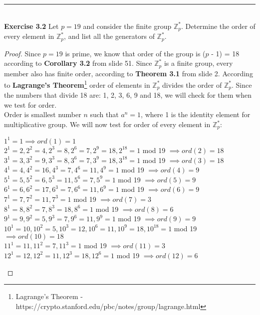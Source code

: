 \documentclass{article}
\begin{document}
\noindent\rule{12cm}{0.4pt}\\
\noindent \textbf{Exercise 3.2} Let $p = 19$ and consider the finite group $\mathbb{Z}^{*}_{p}$. Determine the order of every element in $\mathbb{Z}^{*}_{p}$, and list all the generators of $\mathbb{Z}^{*}_{p}$.
\begin{proof}
Since $p=19$ is prime, we know that order of the group is ($p$ - 1) = 18 according to \textbf{Corollary 3.2} from slide 51. Since $\mathbb{Z}^{*}_{p}$ is a finite group, every member also has finite order, according to \textbf{Theorem 3.1} from slide 2. According to \textbf{Lagrange's Theorem}\footnote{Lagrange's Theorem - https://crypto.stanford.edu/pbc/notes/group/lagrange.html} order of elements in $\mathbb{Z}^{*}_{p}$ divides the order of $\mathbb{Z}^{*}_{p}$. Since the numbers that divide 18 are: 1, 2, 3, 6, 9 and 18, we will check for them when we test for order.\\
Order is smallest number $n$ such that $a^n=1$, where 1 is the identity element for multiplicative group. We will now test for order of every element in $\mathbb{Z}^{*}_{p}$:\\
\begin{center}
$1^1 = 1 \implies ord(1) = 1$\\
$2^1 = 2, 2^2 = 4, 2^3 = 8, 2^6 = 7, 2^9 = 18, 2^{18} = 1$ mod 19 $\implies ord(2) = 18$\\
$3^1 = 3, 3^2 = 9, 3^3 = 8, 3^6 = 7, 3^9 = 18, 3^{18} = 1$ mod 19 $\implies ord(3) = 18$\\
$4^1 = 4, 4^2 = 16, 4^3 = 7, 4^6 = 11, 4^9 = 1$ mod 19 $\implies ord(4) = 9$\\
$5^1 = 5, 5^2 = 6, 5^3 = 11, 5^6 = 7, 5^9 = 1$ mod 19 $\implies ord(5) = 9$\\
$6^1 = 6, 6^2 = 17, 6^3 = 7, 6^6 = 11, 6^9 = 1$ mod 19 $\implies ord(6) = 9$\\
$7^1 = 7, 7^2 = 11, 7^3 = 1$ mod 19 $\implies ord(7) = 3$\\
$8^1 = 8, 8^2 = 7, 8^3 = 18, 8^6 = 1$ mod 19 $\implies ord(8) = 6$\\
$9^1 = 9, 9^2 = 5, 9^3 = 7, 9^6 = 11, 9^9 = 1$ mod 19 $\implies ord(9) = 9$\\
$10^1 = 10, 10^2 = 5, 10^3 = 12, 10^6 = 11, 10^9 = 18, 10^{18} = 1$ mod 19 $\implies ord(10) = 18$\\
$11^1 = 11, 11^2 = 7, 11^3 = 1$ mod 19 $\implies ord(11) = 3$\\
$12^1 = 12, 12^2 = 11, 12^3 = 18, 12^6 = 1$ mod 19 $\implies ord(12) = 6$\\

\end{center}
\end{proof}
\end{document}
